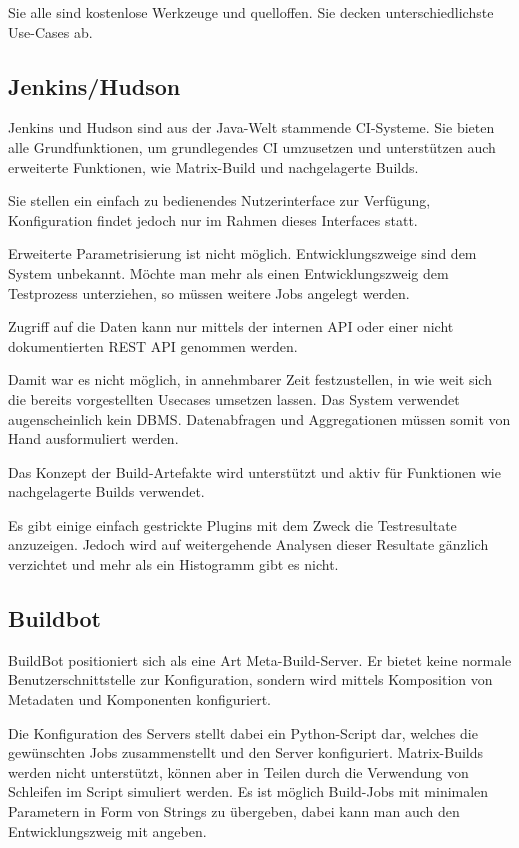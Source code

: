 Sie alle sind kostenlose Werkzeuge und quelloffen.
Sie decken unterschiedlichste Use-Cases ab.

\subsection{Jenkins/Hudson}

Jenkins und Hudson sind aus der Java-Welt  stammende \ac{CI}-Systeme.
Sie bieten alle Grundfunktionen, um grundlegendes \ac{CI} umzusetzen
und unterst\"utzen auch erweiterte Funktionen,
wie Matrix-Build und nachgelagerte Builds.

Sie stellen ein einfach zu bedienendes Nutzerinterface zur Verfügung,
Konfiguration findet jedoch nur im Rahmen dieses Interfaces statt.

Erweiterte Parametrisierung ist nicht m\"oglich.
Entwicklungszweige sind dem System unbekannt.
M\"ochte man mehr als einen Entwicklungszweig dem Testprozess unterziehen,
so m\"ussen weitere Jobs angelegt werden.

Zugriff auf die Daten kann nur mittels der internen \ac{API} oder
einer nicht dokumentierten \ac{REST} \ac{API} genommen werden.

Damit war es nicht m\"oglich, in annehmbarer Zeit festzustellen,
in wie weit sich die bereits vorgestellten Usecases umsetzen lassen.
Das System verwendet augenscheinlich kein \ac{DBMS}.
Datenabfragen und Aggregationen m\"ussen
somit von Hand ausformuliert werden.

Das Konzept der Build-Artefakte wird unterst\"utzt und
aktiv f\"ur Funktionen wie nachgelagerte Builds verwendet.

Es gibt einige einfach gestrickte Plugins mit dem Zweck die Testresultate anzuzeigen.
Jedoch wird auf weitergehende Analysen dieser Resultate g\"anzlich verzichtet
und mehr als ein Histogramm gibt es nicht.


\subsection{Buildbot}


BuildBot \cite{buildbot:website} positioniert sich als eine Art Meta-Build-Server.
Er bietet keine normale Benutzerschnittstelle zur Konfiguration,
sondern wird mittels Komposition von Metadaten und Komponenten konfiguriert.

Die Konfiguration des Servers stellt dabei ein Python-Script dar,
welches die gewünschten Jobs zusammenstellt und den Server konfiguriert.
Matrix-Builds werden nicht unterst\"utzt,
k\"onnen aber in Teilen durch die Verwendung von Schleifen im Script simuliert werden.
Es ist möglich Build-Jobs mit minimalen Parametern in Form von Strings zu \"ubergeben,
dabei kann man auch den Entwicklungszweig mit angeben.

